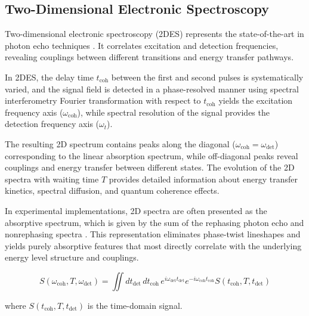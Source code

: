 \subsection{Two-Dimensional Electronic Spectroscopy}
\label{subsec:2d_spectroscopy}

\noindent Two-dimensional electronic spectroscopy (2DES) represents the state-of-the-art in photon echo techniques \cite{jonas2003twodimensionalfemtosecondspectroscopy, brixneretal2004phasestabilizedtwodimensionalelectronic, schlau-cohenetal2011twodimensionalelectronicspectroscopy}. It correlates excitation and detection frequencies, revealing couplings between different transitions and energy transfer pathways.

\noindent In 2DES, the delay time $t_{\text{coh}}$ between the first and second pulses is systematically varied, and the signal field is detected in a phase-resolved manner using spectral interferometry %
Fourier transformation with respect to $t_{\text{coh}}$ yields the excitation frequency axis ($\omega_{\text{coh}}$), while spectral resolution of the signal provides the detection frequency axis ($\omega_t$).

\noindent The resulting 2D spectrum contains peaks along the diagonal ($\omega_{\text{coh}} = \omega_{\text{det}}$) corresponding to the linear absorption spectrum, while off-diagonal peaks reveal couplings and energy transfer between different states. The evolution of the 2D spectra with waiting time $T$ provides detailed information about energy transfer kinetics, spectral diffusion, and quantum coherence effects.

\noindent In experimental implementations, 2D spectra are often presented as the absorptive spectrum, which is given by the sum of the rephasing photon echo and nonrephasing spectra \cite{cho2009twodimensionalopticalspectroscopy}. This representation eliminates phase-twist lineshapes and yields purely absorptive features that most directly correlate with the underlying energy level structure and couplings.

\begin{equation}
	S(\omega_{\text{coh}}, T, \omega_{\text{det}}) = \iint dt_{\text{det}}\, dt_{\text{coh}}\, e^{i\omega_{\text{det}} t_{\text{det}}} e^{-i\omega_{\text{coh}} t_{\text{coh}}} S(t_{\text{coh}}, T, t_{\text{det}})
	\label{eq:2des_signal}
\end{equation}

\noindent where $S(t_{\text{coh}}, T, t_{\text{det}})$ is the time-domain signal.

